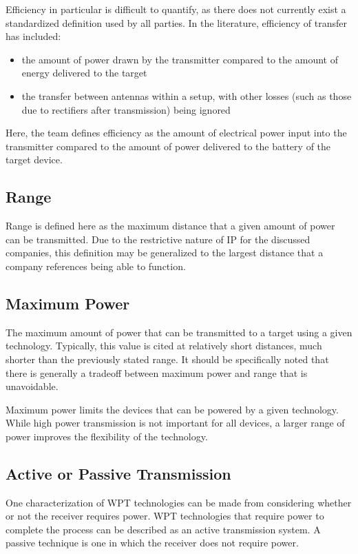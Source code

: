 Efficiency in particular is difficult to quantify, as there does not currently exist a standardized definition used by all parties. In the literature, efficiency of transfer has included:
\begin{itemize}
    \item the amount of power drawn by the transmitter compared to the amount of energy delivered to the target
    \item the transfer between antennas within a setup, with other losses (such as those due to rectifiers after transmission) being ignored
\end{itemize}

Here, the team defines efficiency as the amount of electrical power input into the transmitter compared to the amount of power delivered to the battery of the target device.

\subsection{Range}

Range is defined here as the maximum distance that a given amount of power can be transmitted. Due to the restrictive nature of IP for the discussed companies, this definition may be generalized to the largest distance that a company references being able to function.\\

\subsection{Maximum Power}

The maximum amount of power that can be transmitted to a target using a given technology. Typically, this value is cited at relatively short distances, much shorter than the previously stated range. It should be specifically noted that there is generally a tradeoff between maximum power and range that is unavoidable.

Maximum power limits the devices that can be powered by a given technology. While high power transmission is not important for all devices, a larger range of power improves the flexibility of the technology.

\subsection{Active or Passive Transmission}

One characterization of WPT technologies can be made from considering whether or not the receiver requires power. WPT technologies that require power to complete the process can be described as an active transmission system. A passive technique is one in which the receiver does not require power.

